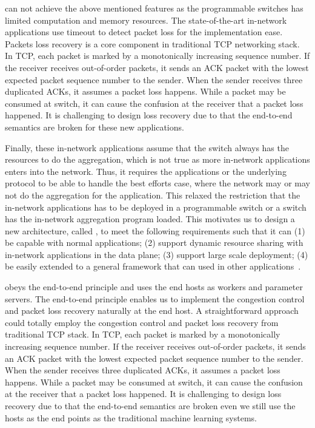 \switchml can not achieve the above mentioned features as the programmable
switches has limited computation and memory resources.
The state-of-the-art in-network applications use timeout to detect packet loss for the implementation ease. Packets loss recovery is a core component in
traditional TCP networking stack.
In TCP, each packet is marked by a monotonically increasing sequence number. 
If the receiver receives out-of-order packets, it sends an ACK packet with the lowest 
expected packet sequence number to the sender. 
When the sender receives three duplicated ACKs, it assumes a packet loss happens.
While a packet may be consumed at switch, it can cause the confusion at the receiver
that a packet loss happened. It is challenging to design loss recovery due to that the end-to-end semantics are broken 
for these new applications.
 
Finally, these in-network applications assume that the switch always has the resources to do the aggregation,
which is not true as more in-network applications enters into the network. Thus, it requires the applications or
the underlying protocol to be able to handle the best efforts case, where the network may or may not do the 
aggregation for the application. This relaxed the restriction that the in-network applications has to be deployed 
in a programmable switch or a switch has the in-network aggregation program loaded.   
\fi 
This motivates us to design a new architecture, called \system, to meet the following requirements such that it can (1) be capable with normal applications; (2) support dynamic resource sharing with in-network applications in the data plane;
(3) support large scale deployment; (4) be easily extended to a general framework that can used in other applications~. 

\system obeys the end-to-end principle and uses the end hosts as workers and parameter servers. 
The end-to-end principle enables us to implement the congestion control and packet loss recovery 
naturally at the end host. A straightforward approach could totally employ 
the congestion control and packet loss recovery from traditional TCP stack.
In TCP, each packet is marked by a monotonically increasing sequence number. 
If the receiver receives out-of-order packets, it sends an ACK packet with the lowest 
expected packet sequence number to the sender. 
When the sender receives three duplicated ACKs, it assumes a packet loss happens.
While a packet may be consumed at switch, it can cause the confusion at the receiver
that a packet loss happened. It is challenging to design loss recovery due to that the end-to-end semantics are broken even we still use the hosts as the end points as the traditional machine learning systems. 
 
